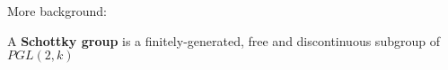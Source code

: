  
More background: 

\begin{definition*} \cite{gvdp} A \textbf{Schottky group} is a finitely-generated, free and discontinuous subgroup of  $PGL(2,k)$
\end{definition*}




